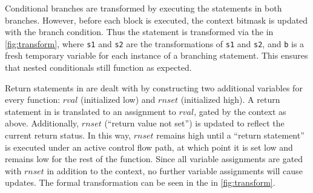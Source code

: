 Conditional branches are transformed by executing the statements in both
branches. However, before each block is executed, the context bitmask is
updated with the branch condition. Thus the statement
is transformed via the  in \autoref{fig:transform},
where \texttt{\textlangle{}s1\textrangle} and \texttt{\textlangle{}s2\textrangle} are the transformations of \texttt{s1} and \texttt{s2}, and \texttt{b} is a fresh temporary variable for each instance of a branching
statement. This ensures that nested conditionals still function as expected.

Return statements in \constc are dealt with by constructing two additional
variables for every function: $rval$ (initialized low) and $rnset$ (initialized
high). A return statement in \constc is translated to an assignment to $rval$,
gated by the context as above. Additionally, $rnset$ (``return value not
set'') is updated to reflect the current return status.
In this way, $rnset$ remains high until a ``return statement'' is executed
under an active control flow path, at which point it is set low and remains low
for the rest of the function. Since all variable assignments are gated with
$rnset$ in addition to the context, no further variable assignments will cause
updates. The formal transformation can be seen in the  in \autoref{fig:transform}.
